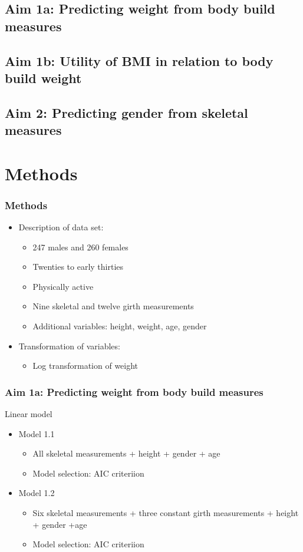 \documentclass{beamer}
\begin{document}
\subsection{Aim 1a: Predicting weight from body build measures}

\subsection{Aim 1b: Utility of BMI in relation to body build weight}

\subsection{Aim 2: Predicting gender from skeletal measures}

\section{Methods}

\begin{frame}
\frametitle{Methods}

\begin{itemize}
	\item Description of data set:  
		\begin{itemize}
			\item 247 males and 260 females
			\item Twenties to early thirties
			\item Physically active
			\item Nine skeletal and twelve girth measurements
			\item Additional variables: height, weight, age, gender
		\end{itemize}
	\item Transformation of variables:
		\begin{itemize}
			\item Log transformation of weight
		\end{itemize}
\end{itemize}

\end{frame}

\begin{frame}
\frametitle{Aim 1a: Predicting weight from body build measures}

Linear model 
\begin{itemize}
	\item Model 1.1
		\begin{itemize}
			\item All skeletal measurements + height + gender + age
			\item Model selection: AIC criteriion
		\end{itemize}
	\item Model 1.2
		\begin{itemize}
			\item Six skeletal measurements + three constant girth measurements + height + gender +age
			\item Model selection: AIC criteriion
		\end{itemize}
\end{itemize}

\end{frame}
\end{document}
